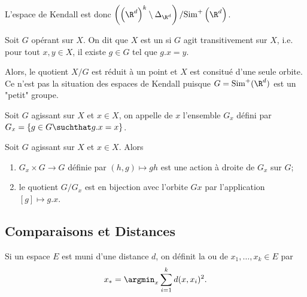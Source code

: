 \begin{proposition}
	L'espace de Kendall est donc $\left(\left(\R^{d}\right)^{k}\setminus \Delta_{\R^{d}}\right) / \mathrm{Sim}^{+}\left(\R^{d}\right)$.
\end{proposition}

\begin{definition}
	Soit $G$ opérant sur $X$. On dit que $X$ est un  si $G$ agit transitivement sur
	$X$, i.e. pour tout $x, y \in X$, il existe $g \in G$ tel que $g.x = y$.
\end{definition}

Alors, le quotient $X / G$ est réduit à un point et $X$ est consitué d'une seule orbite.
Ce n'est pas la situation des espaces de Kendall puisque $G = \mathrm{Sim}^{+}(\R^{d})$ est un "petit"
groupe.

\begin{definition}
	Soit $G$ agissant sur $X$ et $x \in X$, on appelle  de $x$ l'ensemble $G_{x}$
	défini par $G_{x} = \left\{g \in G\suchthat g.x = x\right\}$.
\end{definition}

\begin{thm}
	Soit $G$ agissant sur $X$ et $x\in X$. Alors
	\begin{enumerate}
		\item $G_{x} \times G \to G$ définie par $(h, g) \mapsto gh$ est une action à droite de $G_{x}$ sur $G$;
		\item le quotient $G / G_{x}$ est en bijection avec l'orbite $Gx$ par l'application $[g] \mapsto g.x$.
	\end{enumerate}
\end{thm}

\subsection{Comparaisons et Distances}
\begin{definition}
	Si un espace $E$ est muni d'une distance $d$, on définit la  ou
	 de $x_{1}, \ldots, x_{k} \in E$ par
	\begin{equation*}
		x_{*} = \argmin_{x} \sum_{i = 1}^{k}d(x, x_{i})^{2}.
	\end{equation*}
\end{definition}



